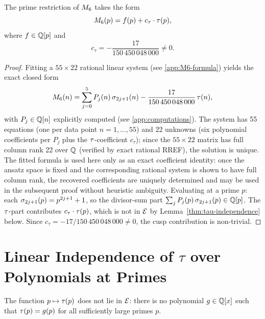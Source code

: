 \documentclass[11pt]{article}
\begin{document}
\begin{lemma}
\label{lem:M6-cusp}
The prime restriction of $M_{6}$ takes the form
\[
  M_{6}(p) = f(p) + c_\tau\cdot\tau(p),
\]
where $f\in\mathbb{Q}[p]$ and
\[
  c_\tau = -\frac{17}{150\,450\,048\,000} \ne 0.
\]
\end{lemma}

\begin{proof}
Fitting a $55\times 22$ rational linear system (see \cref{app:M6-formula}) yields the
exact closed form
\[
  M_{6}(n) = \sum_{j=0}^{5} P_j(n)\,\sigma_{2j+1}(n)
              - \frac{17}{150\,450\,048\,000}\,\tau(n),
\]
with $P_j\in\mathbb{Q}[n]$ explicitly computed (see \cref{app:computations}).
The system has 55 equations (one per data point $n=1,\dots,55$) and 22 unknowns
(six polynomial coefficients per $P_j$ plus the $\tau$-coefficient $c_\tau$);
since the $55\times 22$ matrix has full column rank 22 over $\mathbb{Q}$ (verified by exact
rational RREF), the solution is unique.
The fitted formula is used here only as an exact coefficient identity: once the ansatz
space is fixed and the corresponding rational system is shown to have full column rank,
the recovered coefficients are uniquely determined and may be used in the subsequent proof
without heuristic ambiguity.
Evaluating at a prime $p$: each $\sigma_{2j+1}(p)=p^{2j+1}+1$, so the divisor-sum part
$\sum_j P_j(p)\,\sigma_{2j+1}(p)\in\mathbb{Q}[p]$.
The $\tau$-part contributes $c_\tau\cdot\tau(p)$, which is not in $\mathcal{E}$ by
Lemma~\ref{thm:tau-independence} below.
Since $c_\tau=-17/150\,450\,048\,000\ne 0$, the cusp contribution is non-trivial.
\end{proof}

\section{Linear Independence of $\tau$ over Polynomials at Primes}
\label{sec:independence}

\begin{lemma}
\label{thm:tau-independence}
The function $p\mapsto\tau(p)$ does not lie in $\mathcal{E}$: there is no polynomial
$g\in\mathbb{Q}[x]$ such that $\tau(p)=g(p)$ for all sufficiently large primes $p$.
\end{lemma}
\end{document}
